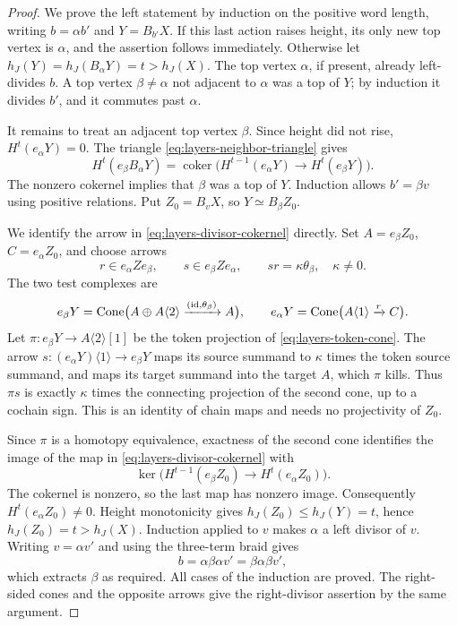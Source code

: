 \begin{proof}
We prove the left statement by induction on the positive word
length, writing $b=\alpha b'$ and $Y=B_{b'}X$.  If this last
action raises height, its only new top vertex is $\alpha$, and
the assertion follows immediately.  Otherwise let
$h_J(Y)=h_J(B_\alpha Y)=t>h_J(X)$.  The top vertex $\alpha$,
if present, already left-divides $b$.  A top vertex $\beta\ne
\alpha$ not adjacent to $\alpha$ was a top of $Y$; by induction
it divides $b'$, and it commutes past $\alpha$.

It remains to treat an adjacent top vertex $\beta$.  Since height
did not rise, $H^t(e_\alpha Y)=0$.  The triangle
\eqref{eq:layers-neighbor-triangle} gives
\begin{equation}
 H^t(e_\beta B_\alpha Y)
 =\operatorname{coker}\bigl(
 H^{t-1}(e_\alpha Y)\longrightarrow H^t(e_\beta Y)\bigr).
 \label{eq:layers-divisor-cokernel}
\end{equation}
The nonzero cokernel implies that $\beta$ was a top of $Y$.
Induction allows $b'=\beta v$ using positive relations.  Put
$Z_0=B_vX$, so $Y\simeq B_\beta Z_0$.

We identify the arrow in
\eqref{eq:layers-divisor-cokernel} directly.  Set
$A=e_\beta Z_0$, $C=e_\alpha Z_0$, and choose arrows
\[
 r\in e_\alpha Z e_\beta,\qquad
 s\in e_\beta Z e_\alpha,\qquad
 sr=\kappa\theta_\beta,\quad\kappa\ne0.
\]
The two test complexes are
\[
 e_\beta Y=\operatorname{Cone}\bigl(A\oplus A\langle2\rangle
                   \xrightarrow{(\operatorname{id},\theta_\beta)}A\bigr),
 \qquad
 e_\alpha Y=\operatorname{Cone}\bigl(A\langle1\rangle
                   \xrightarrow{r}C\bigr).
\]
Let $\pi:e_\beta Y\to A\langle2\rangle[1]$ be the token
projection of \eqref{eq:layers-token-cone}.  The arrow
$s:(e_\alpha Y)\langle1\rangle\to e_\beta Y$ maps its source
summand to $\kappa$ times the token source summand, and maps its
target summand into the target $A$, which $\pi$ kills.  Thus
$\pi s$ is exactly $\kappa$ times the connecting projection of
the second cone, up to a cochain sign.  This is an identity of
chain maps and needs no projectivity of $Z_0$.

Since $\pi$ is a homotopy equivalence, exactness of the second
cone identifies the image of the map in
\eqref{eq:layers-divisor-cokernel} with
\begin{equation}
 \ker\bigl(H^{t-1}(e_\beta Z_0)
                  \longrightarrow H^t(e_\alpha Z_0)\bigr).
 \label{eq:layers-divisor-kernel}
\end{equation}
The cokernel is nonzero, so the last map has nonzero image.
Consequently $H^t(e_\alpha Z_0)\ne0$.  Height monotonicity gives
$h_J(Z_0)\leq h_J(Y)=t$, hence $h_J(Z_0)=t>h_J(X)$.
Induction applied to $v$ makes $\alpha$ a left divisor of $v$.
Writing $v=\alpha v'$ and using the three-term braid gives
\[
 b=\alpha\beta\alpha v'=\beta\alpha\beta v',
\]
which extracts $\beta$ as required.  All cases of the induction
are proved.  The right-sided cones and the opposite arrows give
the right-divisor assertion by the same argument.
\end{proof}

